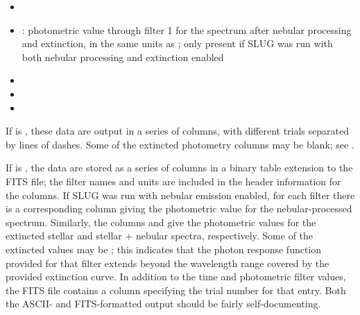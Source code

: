 \documentclass[letterpaper,10pt,english]{sphinxmanual}
\begin{document}
\begin{itemize}
\item {} 

\item {} 
: photometric value through filter 1 for the spectrum after nebular processing and extinction, in the same units as ; only present if SLUG was run with both nebular processing and extinction enabled

\item {} 

\item {} 

\item {} 

\end{itemize}

If  is , these data are output in a series of columns, with different trials separated by lines of dashes. Some of the extincted photometry columns may be blank; see {\hyperref[output:ssec-int-phot-file]{\emph{}}}.

If  is , the data are stored as a series of
columns in a binary table extension to the FITS file; the filter names
and units are included in the header information for the columns. If
SLUG was run with nebular emission enabled, for each filter 
there is a corresponding column  giving the photometric
value for the nebular-processed spectrum. Similarly, the columns
 and  give the photometric values
for the extincted stellar and stellar + nebular spectra, respectively.
Some of the extincted values may be ; this
indicates that the photon response function provided for that filter
extends beyond the wavelength range covered by the provided extinction
curve. In addition to the time and photometric filter values, the FITS
file contains a column specifying the trial number for that
entry. Both the ASCII- and FITS-formatted output should be fairly
self-documenting.
\end{document}
